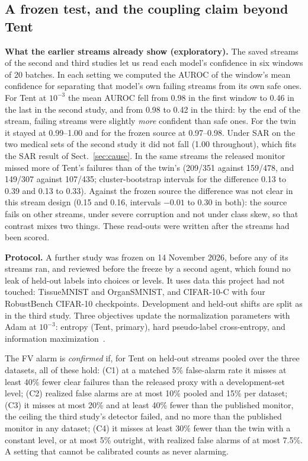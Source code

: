 \documentclass[runningheads]{llncs}
\begin{document}
\subsection{A frozen test, and the coupling claim beyond Tent}
\label{sec:fvtest}
\textbf{What the earlier streams already show (exploratory).} The saved streams of the second and third studies let us read each model's confidence in six windows of 20 batches. In each setting we computed the AUROC of the window's mean confidence for separating that model's own failing streams from its own safe ones. For Tent at $10^{-3}$ the mean AUROC fell from 0.98 in the first window to 0.46 in the last in the second study, and from 0.98 to 0.42 in the third: by the end of the stream, failing streams were slightly \emph{more} confident than safe ones. For the twin it stayed at 0.99--1.00 and for the frozen source at 0.97--0.98. Under SAR on the two medical sets of the second study it did not fall (1.00 throughout), which fits the SAR result of Sect.~\ref{sec:cause}. In the same streams the released monitor missed more of Tent's failures than of the twin's (209/351 against 159/478, and 149/307 against 107/435; cluster-bootstrap intervals for the difference 0.13 to 0.39 and 0.13 to 0.33). Against the frozen source the difference was not clear in this stream design (0.15 and 0.16, intervals $-0.01$ to 0.30 in both): the source fails on other streams, under severe corruption and not under class skew, so that contrast mixes two things. These read-outs were written after the streams had been scored.

\textbf{Protocol.} A further study was frozen on 14 November 2026, before any of its streams ran, and reviewed before the freeze by a second agent, which found no leak of held-out labels into choices or levels. It uses data this project had not touched: TissueMNIST and OrganSMNIST, and CIFAR-10-C with four RobustBench CIFAR-10 checkpoints. Development and held-out shifts are split as in the third study. Three objectives update the normalization parameters with Adam at $10^{-3}$: entropy (Tent, primary), hard pseudo-label cross-entropy, and information maximization~\cite{Liang2020SHOT}.

The FV alarm is \emph{confirmed} if, for Tent on held-out streams pooled over the three datasets, all of these hold: (C1) at a matched 5\% false-alarm rate it misses at least 40\% fewer clear failures than the released proxy with a development-set level; (C2) realized false alarms are at most 10\% pooled and 15\% per dataset; (C3) it misses at most 20\% and at least 40\% fewer than the published monitor, the ceiling the third study's detector failed, and no more than the published monitor in any dataset; (C4) it misses at least 30\% fewer than the twin with a constant level, or at most 5\% outright, with realized false alarms of at most 7.5\%. A setting that cannot be calibrated counts as never alarming.
\end{document}
